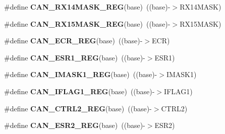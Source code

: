 \begin{DoxyCompactItemize}
\item 
\#define {\bfseries C\+A\+N\+\_\+\+R\+X14\+M\+A\+S\+K\+\_\+\+R\+EG}(base)~((base)-\/$>$R\+X14\+M\+A\+SK)\hypertarget{group__CAN__Register__Accessor__Macros_ga8519491edf61d4104ce40f321d49e139}{}\label{group__CAN__Register__Accessor__Macros_ga8519491edf61d4104ce40f321d49e139}

\item 
\#define {\bfseries C\+A\+N\+\_\+\+R\+X15\+M\+A\+S\+K\+\_\+\+R\+EG}(base)~((base)-\/$>$R\+X15\+M\+A\+SK)\hypertarget{group__CAN__Register__Accessor__Macros_ga742c3294ee974e1ea04b35e6553bc45b}{}\label{group__CAN__Register__Accessor__Macros_ga742c3294ee974e1ea04b35e6553bc45b}

\item 
\#define {\bfseries C\+A\+N\+\_\+\+E\+C\+R\+\_\+\+R\+EG}(base)~((base)-\/$>$E\+CR)\hypertarget{group__CAN__Register__Accessor__Macros_ga9ecb0d114e3a4a5f5e7de0c4071f8e09}{}\label{group__CAN__Register__Accessor__Macros_ga9ecb0d114e3a4a5f5e7de0c4071f8e09}

\item 
\#define {\bfseries C\+A\+N\+\_\+\+E\+S\+R1\+\_\+\+R\+EG}(base)~((base)-\/$>$E\+S\+R1)\hypertarget{group__CAN__Register__Accessor__Macros_gacace34b428b6078b131eef38e89399b8}{}\label{group__CAN__Register__Accessor__Macros_gacace34b428b6078b131eef38e89399b8}

\item 
\#define {\bfseries C\+A\+N\+\_\+\+I\+M\+A\+S\+K1\+\_\+\+R\+EG}(base)~((base)-\/$>$I\+M\+A\+S\+K1)\hypertarget{group__CAN__Register__Accessor__Macros_gac1c652fcb64287bcac74fe68ba37e841}{}\label{group__CAN__Register__Accessor__Macros_gac1c652fcb64287bcac74fe68ba37e841}

\item 
\#define {\bfseries C\+A\+N\+\_\+\+I\+F\+L\+A\+G1\+\_\+\+R\+EG}(base)~((base)-\/$>$I\+F\+L\+A\+G1)\hypertarget{group__CAN__Register__Accessor__Macros_gaf123350c900ffdd62905693b7cbf0a84}{}\label{group__CAN__Register__Accessor__Macros_gaf123350c900ffdd62905693b7cbf0a84}

\item 
\#define {\bfseries C\+A\+N\+\_\+\+C\+T\+R\+L2\+\_\+\+R\+EG}(base)~((base)-\/$>$C\+T\+R\+L2)\hypertarget{group__CAN__Register__Accessor__Macros_ga252e9179119410fbab775da88dbbcff6}{}\label{group__CAN__Register__Accessor__Macros_ga252e9179119410fbab775da88dbbcff6}

\item 
\#define {\bfseries C\+A\+N\+\_\+\+E\+S\+R2\+\_\+\+R\+EG}(base)~((base)-\/$>$E\+S\+R2)\hypertarget{group__CAN__Register__Accessor__Macros_gad3298babfd7b15e542b3d5fefca3c98e}{}\label{group__CAN__Register__Accessor__Macros_gad3298babfd7b15e542b3d5fefca3c98e}


\end{DoxyCompactItemize}
